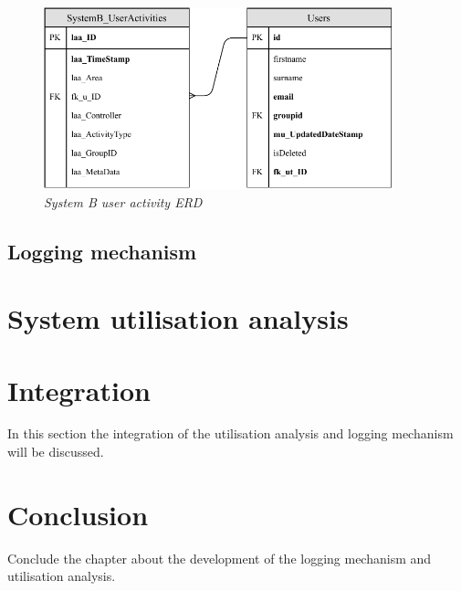 \begin{figure}[!htb] %
	\centering %
	\includegraphics[width=0.9\textwidth]{Images/Chapter2/SystemB_ERD_Basic/SystemB_ERD_Basic.pdf}
	\caption[System B user activity ERD]
	{\textit{System B user activity ERD}} \label{fig:SystemB_Basic_ERD}
\end{figure}

\subsection{Logging mechanism}

\section{System utilisation analysis}

\section{Integration}
In this section the integration of the utilisation analysis and logging mechanism will be discussed.

\section{Conclusion}
Conclude the chapter about the development of the logging mechanism and utilisation analysis.